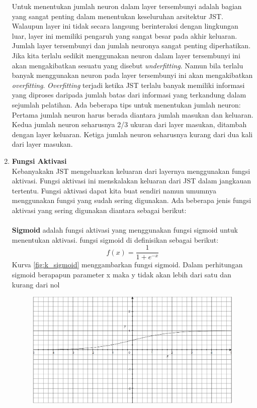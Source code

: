 \begin{enumerate}
\begin{table}
\begin{tabular}{|l|p{12cm}|}
\end{tabular}
\end{table}
Untuk menentukan jumlah neuron dalam layer tersembunyi adalah bagian yang sangat penting dalam menentukan keseluruhan arsitektur JST. Walaupun layer ini tidak secara langsung berinteraksi dengan lingkungan luar, layer ini memiliki pengaruh yang sangat besar pada akhir keluaran. Jumlah layer tersembunyi dan jumlah neuronya sangat penting diperhatikan. Jika kita terlalu sedikit menggunakan neuron dalam layer tersembunyi ini akan mengakibatkan sesuatu yang disebut \textit{underfitting}. Namun bila terlalu banyak menggunakan neuron pada layer tersembunyi ini akan mengakibatkan \textit{overfitting}. \textit{Overfitting} terjadi ketika JST terlalu banyak memiliki informasi yang diproses daripada jumlah batas dari informasi yang terkandung dalam sejumlah pelatihan. Ada beberapa tips untuk menentukan jumlah neuron: Pertama jumlah neuron harus berada diantara jumlah masukan dan keluaran. Kedua jumlah neuron seharusnya 2/3 ukuran dari layer masukan, ditambah dengan layer keluaran. Ketiga jumlah neuron seharusnya kurang dari dua kali dari layer masukan.
\item\textbf{Fungsi Aktivasi}\\
Kebanyakakn JST mengeluarkan keluaran dari layernya menggunakan fungsi aktivasi. Fungsi aktivasi ini menskalakan keluaran dari JST dalam jangkauan tertentu. Fungsi aktivasi dapat kita buat sendiri namun umumnya menggunakan fungsi yang sudah sering digunakan. Ada beberapa jenis fungsi aktivasi yang sering digunakan diantara sebagai berikut:\\\\
\textbf{Sigmoid} adalah fungsi aktivasi yang menggunakan fungsi sigmoid untuk menentukan aktivasi. fungsi sigmoid di definisikan sebagai berikut:
\begin{displaymath}
	f(x)=\frac{1}{1+e^{-x}}
\end{displaymath}
Kurva \ref{fig:k_sigmoid} menggambarkan fungsi sigmoid. Dalam perhitungan sigmoid berapapun parameter x maka y tidak akan lebih dari satu dan kurang dari nol
\begin{figure}
	\centering
	\includegraphics[width=0.6\linewidth]{Gambar/mine/sigmoid}

\end{figure}
\end{enumerate}
